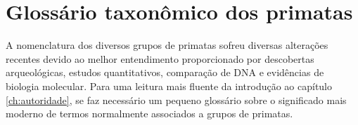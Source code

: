 \chapter{Glossário taxonômico dos primatas}
\label{ap:glossario}

A nomenclatura dos diversos grupos de primatas sofreu diversas alterações recentes devido ao melhor entendimento proporcionado por descobertas arqueológicas, estudos quantitativos, comparação de DNA e evidências de biologia molecular. Para uma leitura mais fluente da introdução ao capítulo \ref{ch:autoridade}, se faz necessário um pequeno glossário sobre o significado mais moderno de termos normalmente associados a grupos de primatas. 

